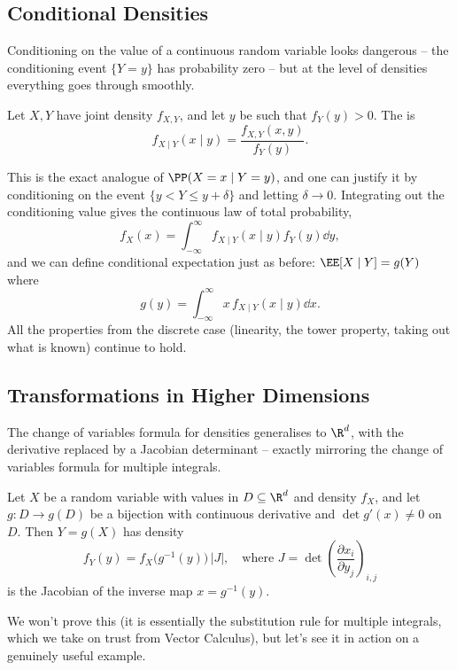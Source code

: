 \subsection{Conditional Densities}

Conditioning on the value of a continuous random variable looks dangerous -- the conditioning event $\{Y = y\}$ has probability zero -- but at the level of densities everything goes through smoothly.

\begin{definition}
	Let $X, Y$ have joint density $f_{X, Y}$, and let $y$ be such that $f_Y(y) > 0$. The  is
	$$
	f_{X \mid Y}(x \mid y) = \frac{f_{X, Y}(x, y)}{f_Y(y)}.
	$$
\end{definition}

This is the exact analogue of $\PP(X = x \mid Y = y)$, and one can justify it by conditioning on the event $\{y < Y \leq y + \delta\}$ and letting $\delta \rightarrow 0$. Integrating out the conditioning value gives the continuous law of total probability,
$$
f_X(x) = \int_{-\infty}^{\infty} f_{X \mid Y}(x \mid y) f_Y(y) \dd y,
$$
and we can define conditional expectation just as before: $\EE[X \mid Y] = g(Y)$ where
$$
g(y) = \int_{-\infty}^{\infty} x \, f_{X \mid Y}(x \mid y)\dd x.
$$
All the properties from the discrete case (linearity, the tower property, taking out what is known) continue to hold.

\subsection{Transformations in Higher Dimensions}

The change of variables formula for densities generalises to $\R^d$, with the derivative replaced by a Jacobian determinant -- exactly mirroring the change of variables formula for multiple integrals.

\begin{theorem}
	Let $X$ be a random variable with values in $D \subseteq \R^d$ and density $f_X$, and let $g: D \rightarrow g(D)$ be a bijection with continuous derivative and $\det g'(x) \neq 0$ on $D$. Then $Y = g(X)$ has density
	$$
	f_Y(y) = f_X\big(g^{-1}(y)\big) \, |J|, \quad \text{where } J = \det\left(\frac{\partial x_i}{\partial y_j}\right)_{i, j}
	$$
	is the Jacobian of the inverse map $x = g^{-1}(y)$.
\end{theorem}

We won't prove this (it is essentially the substitution rule for multiple integrals, which we take on trust from Vector Calculus), but let's see it in action on a genuinely useful example.

